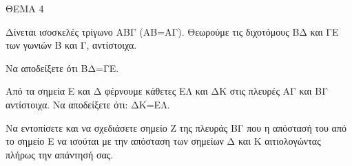 
ΘΕΜΑ 4

Δίνεται ισοσκελές τρίγωνο ΑΒΓ (ΑΒ=ΑΓ). Θεωρούμε τις διχοτόμους ΒΔ και ΓΕ των γωνιών Β και Γ, αντίστοιχα.

\begin{alist}
\item Να αποδείξετε ότι ΒΔ=ΓΕ. 

\item Από τα σημεία Ε και Δ φέρνουμε κάθετες ΕΛ και ΔΚ στις πλευρές ΑΓ και ΒΓ αντίστοιχα. Να αποδείξετε ότι: ΔΚ=ΕΛ. 

\item Να εντοπίσετε και να σχεδιάσετε σημείο Ζ της πλευράς ΒΓ που η απόστασή του από το σημείο Ε να ισούται με την απόσταση των σημείων Δ και Κ αιτιολογώντας πλήρως την απάντησή σας. 


\end{alist}
